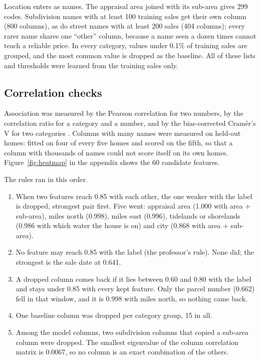 \documentclass[sigconf,nonacm,10pt]{acmart}
\begin{document}
Location enters as names. The appraisal area joined with its sub-area gives 299 codes. Subdivision names with at least 100 training sales get their own column (800 columns), as do street names with at least 200 sales (404 columns); every rarer name shares one ``other'' column, because a name seen a dozen times cannot teach a reliable price. In every category, values under 0.1\% of training sales are grouped, and the most common value is dropped as the baseline. All of these lists and thresholds were learned from the training sales only.

\subsection{Correlation checks}
\label{sec:checks}
Association was measured by the Pearson correlation for two numbers, by the correlation ratio for a category and a number, and by the bias-corrected Cram\'er's V for two categories \cite{cramer1946,bergsma2013}. Columns with many names were measured on held-out homes: fitted on four of every five homes and scored on the fifth, so that a column with thousands of names could not score itself on its own homes. Figure~\ref{fig:heatmap} in the appendix shows the 60 candidate features.

The rules ran in this order.
\begin{enumerate}
\item When two features reach 0.85 with each other, the one weaker with the label is dropped, strongest pair first. Five went: appraisal area (1.000 with area + sub-area), miles north (0.998), miles east (0.996), tidelands or shorelands (0.986 with which water the house is on) and city (0.868 with area + sub-area).
\item No feature may reach 0.85 with the label (the professor's rule). None did; the strongest is the sale date at 0.641.
\item A dropped column comes back if it lies between 0.60 and 0.80 with the label and stays under 0.85 with every kept feature. Only the parcel number (0.662) fell in that window, and it is 0.998 with miles north, so nothing came back.
\item One baseline column was dropped per category group, 15 in all.
\item Among the model columns, two subdivision columns that copied a sub-area column were dropped. The smallest eigenvalue of the column correlation matrix is 0.0067, so no column is an exact combination of the others.
\end{enumerate}
\end{document}
